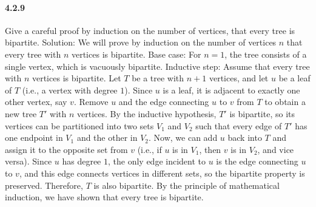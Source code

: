 \documentclass{article}
\begin{document}
 \paragraph{4.2.9}
 Give a careful proof by induction on the number of vertices, that every tree is bipartite.\newline
Solution:\newline
We will prove by induction on the number of vertices $n$ that every tree with $n$ vertices is bipartite.\newline
Base case: For $n = 1$, the tree consists of a single vertex, which is vacuously bipartite.\newline
Inductive step: Assume that every tree with $n$ vertices is bipartite. Let $T$ be a tree with $n+1$ vertices, and let $u$ be a leaf of $T$ (i.e., a vertex with degree $1$).\newline
Since $u$ is a leaf, it is adjacent to exactly one other vertex, say $v$. Remove $u$ and the edge connecting $u$ to $v$ from $T$ to obtain a new tree $T'$ with $n$ vertices. By the inductive hypothesis, $T'$ is bipartite, so its vertices can be partitioned into two sets $V_1$ and $V_2$ such that every edge of $T'$ has one endpoint in $V_1$ and the other in $V_2$.\newline
Now, we can add $u$ back into $T$ and assign it to the opposite set from $v$ (i.e., if $u$ is in $V_1$, then $v$ is in $V_2$, and vice versa). Since $u$ has degree $1$, the only edge incident to $u$ is the edge connecting $u$ to $v$, and this edge connects vertices in different sets, so the bipartite property is preserved. Therefore, $T$ is also bipartite.\newline
By the principle of mathematical induction, we have shown that every tree is bipartite.
\end{document}
